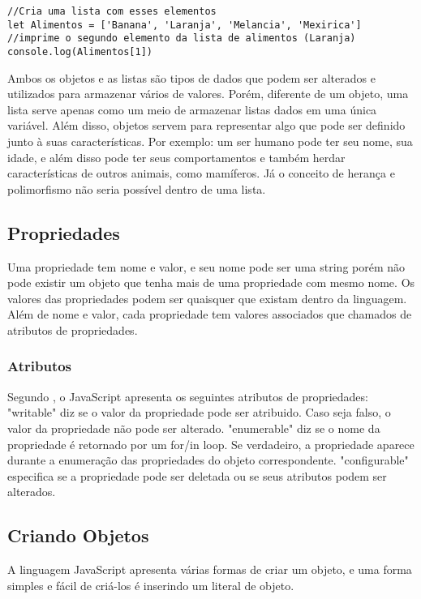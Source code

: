 \begin{lstlisting}
//Cria uma lista com esses elementos
let Alimentos = ['Banana', 'Laranja', 'Melancia', 'Mexirica']  
//imprime o segundo elemento da lista de alimentos (Laranja) 
console.log(Alimentos[1])  
\end{lstlisting}

Ambos os objetos e as listas são tipos de dados que podem ser alterados e utilizados para armazenar vários de valores. Porém, diferente de um objeto, uma lista serve apenas como um meio de armazenar listas dados em uma única variável. Além disso, objetos servem para representar algo que pode ser definido junto à suas características. Por exemplo: um ser humano pode ter seu nome, sua idade, e além disso pode ter seus comportamentos e também herdar características de outros animais, como mamíferos. Já o conceito de herança e polimorfismo não seria possível dentro de uma lista.

\subsection{Propriedades}
	Uma propriedade tem nome e valor, e seu nome pode ser uma string porém não pode existir um objeto que tenha mais de uma propriedade com mesmo nome. Os valores das propriedades podem ser quaisquer que existam dentro da linguagem. \newline
	Além de nome e valor, cada propriedade tem valores associados que chamados de atributos de propriedades. 
	
	\subsubsection{Atributos}
	Segundo \cite{flanagan2020javascript}, o JavaScript apresenta os seguintes atributos de propriedades:
	"writable" diz se o valor da propriedade pode ser atribuido. Caso seja falso, o valor da propriedade não pode ser alterado.
	"enumerable" diz se o nome da propriedade é retornado por um for/in loop. Se verdadeiro, a propriedade aparece durante a enumeração das propriedades do objeto correspondente. 
	"configurable" especifica se a propriedade pode ser deletada ou se seus atributos podem ser alterados.
\subsection{Criando Objetos}
	A linguagem JavaScript apresenta várias formas de criar um objeto, e uma forma simples e fácil de criá-los é inserindo um literal de objeto. 

